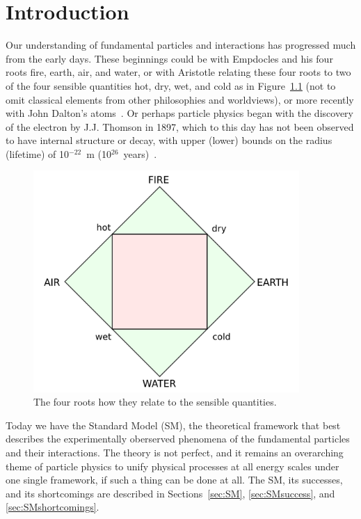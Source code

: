 
\chapter{Introduction\label{ch:intro}}

Our understanding of fundamental particles and interactions has progressed much from the early days.
These beginnings could be with Empdocles and his four roots fire, earth, air, and water, or with
Aristotle relating these four roots to two of the four sensible quantities hot, dry, wet, and cold as
in Figure~\ref{fig:aristotle}
(not to omit classical elements from other philosophies and worldviews), or more recently with
John Dalton's atoms~\cite{0415078547,dalton}. Or perhaps particle physics began with
the discovery of the electron by J.J. Thomson in 1897, which to this day has not been observed
to have internal structure or decay, with upper (lower) bounds on the radius (lifetime) of
10$^{-22}$~m (10$^{26}$~years)~\cite{thomson:electron,1988PhST...22..102D,2002PhLB..525...29B}.

\begin{figure}[ht]
 \begin{center}
    \includegraphics[width=0.90\textwidth]{figures/intro/Four_elements_representation.png}
      \end{center}
\caption{The four roots how they relate to the sensible quantities.}
\label{fig:aristotle}
\end{figure}

Today we have the Standard Model (SM), the theoretical framework that best describes the
experimentally oberserved phenomena of the fundamental particles and their interactions. The theory
is not perfect, and it remains an overarching theme of particle physics to unify physical processes
at all energy scales under one single framework, if such a thing can be done at all.
The SM, its successes, and its shortcomings are described in
Sections~\ref{sec:SM}, \ref{sec:SMsuccess}, and \ref{sec:SMshortcomings}.

